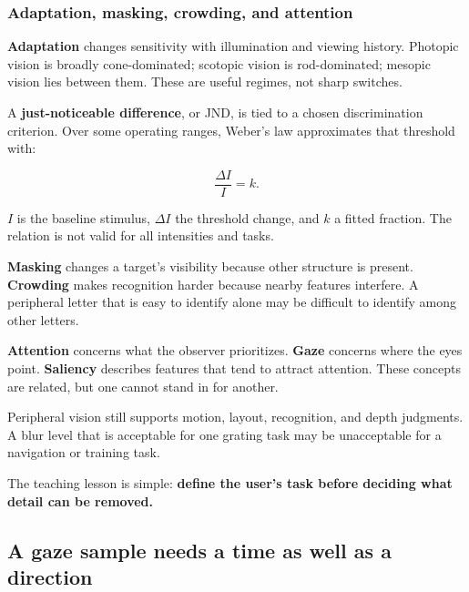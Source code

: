 \subsubsection{Adaptation, masking, crowding, and attention}\label{04-visual-computing-ii-ch042-adaptation-masking-crowding-and-attention}

\hypertarget{04-visual-computing-ii-ch042-adaptation-masking-crowding-and-attention}{}

\textbf{Adaptation} changes sensitivity with illumination and viewing history. Photopic vision is broadly cone-dominated; scotopic vision is rod-dominated; mesopic vision lies between them. These are useful regimes, not sharp switches.

A \textbf{just-noticeable difference}, or JND, is tied to a chosen discrimination criterion. Over some operating ranges, Weber's law approximates that threshold with:

\[
\frac{\Delta I}{I}=k.
\]

\(I\) is the baseline stimulus, \(\Delta I\) the threshold change, and \(k\) a fitted fraction. The relation is not valid for all intensities and tasks.

\textbf{Masking} changes a target's visibility because other structure is present. \textbf{Crowding} makes recognition harder because nearby features interfere. A peripheral letter that is easy to identify alone may be difficult to identify among other letters.

\textbf{Attention} concerns what the observer prioritizes. \textbf{Gaze} concerns where the eyes point. \textbf{Saliency} describes features that tend to attract attention. These concepts are related, but one cannot stand in for another.

Peripheral vision still supports motion, layout, recognition, and depth judgments. A blur level that is acceptable for one grating task may be unacceptable for a navigation or training task.

The teaching lesson is simple: \textbf{define the user's task before deciding what detail can be removed.}

\subsection{A gaze sample needs a time as well as a direction}\label{04-visual-computing-ii-ch042-a-gaze-sample-needs-a-time-as-well-as-a-direction}

\hypertarget{04-visual-computing-ii-ch042-a-gaze-sample-needs-a-time-as-well-as-a-direction}{}

